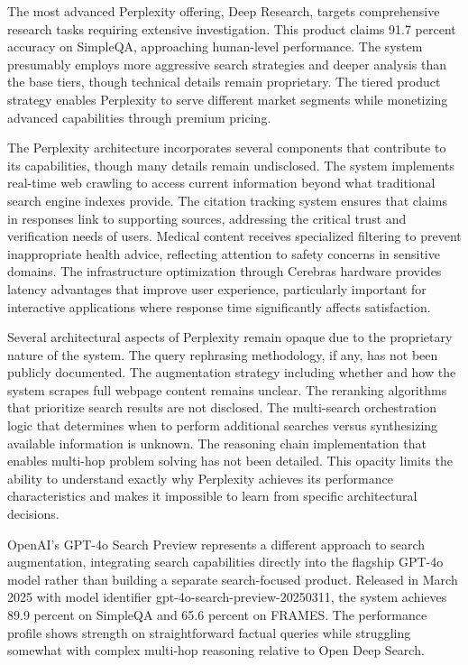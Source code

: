 The most advanced Perplexity offering, Deep Research, targets comprehensive research tasks requiring extensive investigation. This product claims 91.7 percent accuracy on SimpleQA, approaching human-level performance. The system presumably employs more aggressive search strategies and deeper analysis than the base tiers, though technical details remain proprietary. The tiered product strategy enables Perplexity to serve different market segments while monetizing advanced capabilities through premium pricing.

The Perplexity architecture incorporates several components that contribute to its capabilities, though many details remain undisclosed. The system implements real-time web crawling to access current information beyond what traditional search engine indexes provide. The citation tracking system ensures that claims in responses link to supporting sources, addressing the critical trust and verification needs of users. Medical content receives specialized filtering to prevent inappropriate health advice, reflecting attention to safety concerns in sensitive domains. The infrastructure optimization through Cerebras hardware provides latency advantages that improve user experience, particularly important for interactive applications where response time significantly affects satisfaction.

Several architectural aspects of Perplexity remain opaque due to the proprietary nature of the system. The query rephrasing methodology, if any, has not been publicly documented. The augmentation strategy including whether and how the system scrapes full webpage content remains unclear. The reranking algorithms that prioritize search results are not disclosed. The multi-search orchestration logic that determines when to perform additional searches versus synthesizing available information is unknown. The reasoning chain implementation that enables multi-hop problem solving has not been detailed. This opacity limits the ability to understand exactly why Perplexity achieves its performance characteristics and makes it impossible to learn from specific architectural decisions.

OpenAI's GPT-4o Search Preview represents a different approach to search augmentation, integrating search capabilities directly into the flagship GPT-4o model rather than building a separate search-focused product. Released in March 2025 with model identifier gpt-4o-search-preview-20250311, the system achieves 89.9 percent on SimpleQA and 65.6 percent on FRAMES. The performance profile shows strength on straightforward factual queries while struggling somewhat with complex multi-hop reasoning relative to Open Deep Search.

